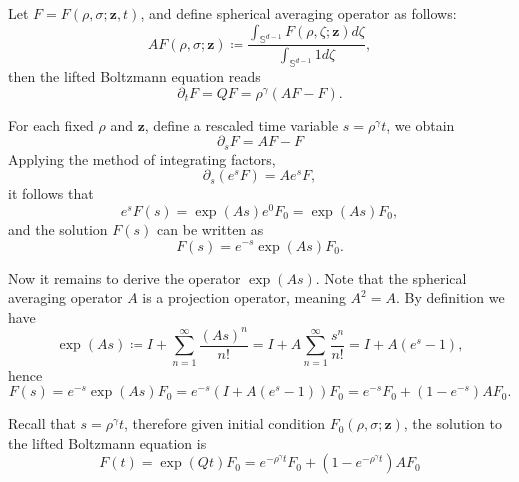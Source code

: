 \documentclass{article}
\numberwithin{equation}{section}
\begin{document}
Let $F = F(\rho, \sigma; \mathbf{z},t)$, and define spherical averaging operator as follows:
\begin{equation*}
    A F(\rho, \sigma;\mathbf{z}) \coloneqq \frac{\int_{\mathbb{S}^{d-1}}  F(\rho, \zeta;\mathbf{z}) d\zeta}{\int_{\mathbb{S}^{d-1}}1d\zeta},
\end{equation*}
then the lifted Boltzmann equation reads
\begin{equation}\label{eq:simpleBoltz}
    \partial_{t} F = QF =\rho^{\gamma} \left(A F - F\right).
\end{equation}

For each fixed $\rho$ and $\mathbf{z}$, define a rescaled time variable $s = \rho^{\gamma}t$, we obtain
\begin{equation*}
    \partial_{s}F = AF - F
\end{equation*}
Applying the method of integrating factors,
\begin{equation*}
    \partial_{s}\left(e^{s}F\right) = A e^{s}F,
\end{equation*}
it follows that
\begin{equation*}
    e^{s} F(s) = \exp(As) e^{0} F_{0} = \exp(As)F_{0},
\end{equation*}
and the solution $F(s)$ can be written as
\begin{equation*}
    F(s) = e^{-s}\exp(As)F_{0}.
\end{equation*}

Now it remains to derive the operator $\exp(As)$. Note that the spherical averaging operator $A$ is a projection operator, meaning $A^{2} = A$. By definition we have
\begin{equation*}
    \exp(As) \coloneqq  I + \sum_{n=1}^{\infty} \frac{(As)^{n}}{n!} = I + A \sum_{n=1}^{\infty} \frac{s^{n}}{n!}=I + A(e^{s}-1),
\end{equation*}
hence
\begin{equation*}
    F(s) = e^{-s}\exp(As)F_{0} = e^{-s}\left(I + A(e^{s}-1)\right)F_{0} = e^{-s}F_{0} + (1-e^{-s})AF_{0}.
\end{equation*}

Recall that $s= \rho^{\gamma}t$, therefore given initial condition $F_{0}(\rho, \sigma; \mathbf{z})$, the solution to the lifted Boltzmann equation is 
\begin{equation}\label{eq:sol_to_Boltz}
    F(t) =\exp{(Qt)}F_{0}= e^{-\rho^{\gamma}t} F_{0}+ \left(1-e^{-\rho^{\gamma}t}\right)AF_{0}
\end{equation}
\end{document}
